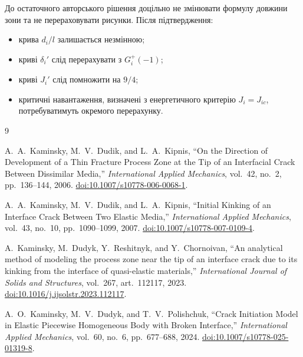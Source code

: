\documentclass[12pt,a4paper]{article}
\begin{document}
До остаточного авторського рішення доцільно не змінювати
формулу довжини зони та не перераховувати рисунки. Після
підтвердження:
\begin{itemize}
  \item крива $d_i/l$ залишається незмінною;
  \item криві $\delta_i'$ слід перерахувати з
  $G_i^+(-1)$;
  \item криві $J_i'$ слід помножити на $9/4$;
  \item критичні навантаження, визначені з енергетичного критерію
  $J_i=J_{ic}$, потребуватимуть окремого перерахунку.
\end{itemize}

\begin{thebibliography}{9}

A.~A.~Kaminsky, M.~V.~Dudik, and L.~A.~Kipnis,
``On the Direction of Development of a Thin Fracture Process Zone
at the Tip of an Interfacial Crack Between Dissimilar Media,''
\emph{International Applied Mechanics}, vol.~42, no.~2,
pp.~136--144, 2006.
\href{https://doi.org/10.1007/s10778-006-0068-1}
{doi:10.1007/s10778-006-0068-1}.

A.~A.~Kaminsky, M.~V.~Dudik, and L.~A.~Kipnis,
``Initial Kinking of an Interface Crack Between Two Elastic Media,''
\emph{International Applied Mechanics}, vol.~43, no.~10,
pp.~1090--1099, 2007.
\href{https://doi.org/10.1007/s10778-007-0109-4}
{doi:10.1007/s10778-007-0109-4}.

A.~Kaminsky, M.~Dudyk, Y.~Reshitnyk, and Y.~Chornoivan,
``An analytical method of modeling the process zone near the tip of
an interface crack due to its kinking from the interface of
quasi-elastic materials,''
\emph{International Journal of Solids and Structures},
vol.~267, art.~112117, 2023.
\href{https://doi.org/10.1016/j.ijsolstr.2023.112117}
{doi:10.1016/j.ijsolstr.2023.112117}.

A.~O.~Kaminsky, M.~V.~Dudyk, and T.~V.~Polishchuk,
``Crack Initiation Model in Elastic Piecewise Homogeneous Body
with Broken Interface,''
\emph{International Applied Mechanics}, vol.~60, no.~6,
pp.~677--688, 2024.
\href{https://doi.org/10.1007/s10778-025-01319-8}
{doi:10.1007/s10778-025-01319-8}.

\end{thebibliography}
\end{document}
